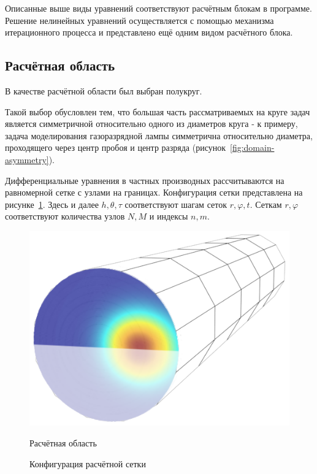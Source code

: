 Описанные выше виды уравнений соответствуют расчётным блокам в программе.
Решение нелинейных уравнений осуществляется с помощью механизма итерационного 
процесса и представлено ещё одним видом расчётного блока.

\subsection{Расчётная область}
В качестве расчётной области был выбран полукруг.

Такой выбор обусловлен тем, что большая часть рассматриваемых на круге задач 
является симметричной относительно одного из диаметров круга - к примеру, 
задача моделирования газоразрядной лампы симметрична относительно диаметра, 
проходящего через центр пробоя и центр разряда 
(рисунок~\ref{fig:domain-asymmetry}).

Дифференциальные уравнения в частных производных рассчитываются на равномерной 
сетке с узлами на границах. Конфигурация сетки представлена на 
рисунке~\ref{fig:domain-grid}. Здесь и далее $h, \theta, \tau$ соответствуют 
шагам сеток $r, \varphi, t$. Сеткам $r, \varphi$ соответствуют количества узлов 
$N,M$ и индексы $n, m$.

\begin{figure}
    \centering
    \begin{minipage}[t]{.45\linewidth}
        \centering
        \includegraphics[width=\textwidth]{img/domain/asymmetry}
        \caption{Расчётная область}
        \label{fig:domain-asymmetry}
    \end{minipage}%
    \hspace{.1\linewidth}%
    \begin{minipage}[t]{.45\linewidth}
        \centering
        \resizebox{\linewidth}{!}
        {
            
        }
        \caption{Конфигурация расчётной сетки}
        \label{fig:domain-grid}
    \end{minipage}
\end{figure}

